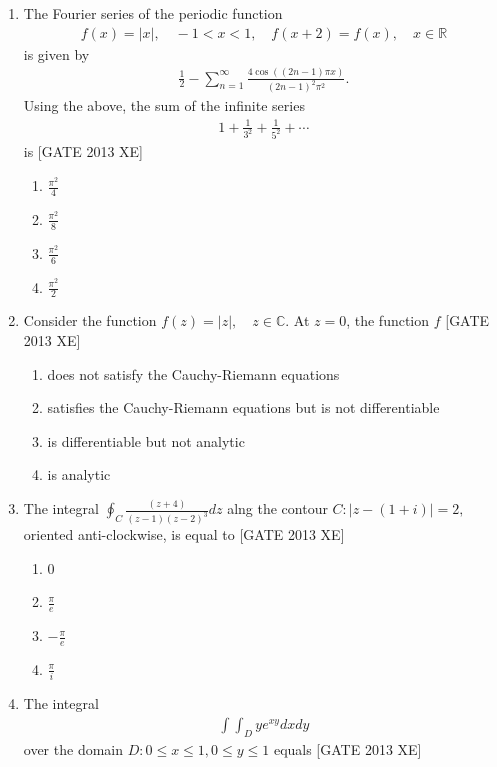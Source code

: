 \documentclass[journal,12pt,onecolumn]{IEEEtran}
\theoremstyle{remark}
\begin{document}
\begin{enumerate}
\item The Fourier series of the periodic function 
\begin{align}
    f(x) = |x|, \quad -1 < x < 1, \quad f(x+2) = f(x), \quad x \in \mathbb{R}
\end{align}
is given by 
\begin{align}
\frac{1}{2} - \sum_{n=1}^\infty \frac{4 \cos((2n-1) \pi x)}{(2n-1)^2 \pi^2}.
\end{align}
Using the above, the sum of the infinite series 
\begin{align}
1 + \frac{1}{3^2} + \frac{1}{5^2} + \cdots
\end{align}
is  \hfill[GATE 2013 XE]

\begin{multicols}{4}
\begin{enumerate}
\item $\frac{\pi^2}{4}$
\item $\frac{\pi^2}{8}$
\item $\frac{\pi^2}{6}$
\item $\frac{\pi^2}{2}$
\end{enumerate}
\end{multicols}

\item Consider the function 
$
f(z) = |z|, \quad z \in \mathbb{C}.
$
At $z=0$, the function $f$  \hfill[GATE 2013 XE]

\begin{multicols}{2}
\begin{enumerate}
\item does not satisfy the Cauchy-Riemann equations
\item satisfies the Cauchy-Riemann equations but is not differentiable
\item is differentiable but not analytic
\item is analytic
\end{enumerate}
\end{multicols}

\item The integral 
$
\oint_C \frac{(z+4)}{(z-1)(z-2)^3} dz
$
alng the contour 
$
C: |z - (1 + i)| = 2,
$
oriented anti-clockwise, is equal to  \hfill[GATE 2013 XE]
\begin{multicols}{4}
\begin{enumerate}
\item $0$
\item $\frac{\pi}{e}$
\item $-\frac{\pi}{e}$
\item $\frac{\pi}{i}$
\end{enumerate}
\end{multicols}
\item The integral 
\begin{align}
    \int \int_D y e^{xy} dx dy
\end{align}
over the domain \(D: 0 \leq x \leq 1, 0 \leq y \leq 1\) equals \hfill[GATE 2013 XE]


\end{enumerate}
\end{document}

